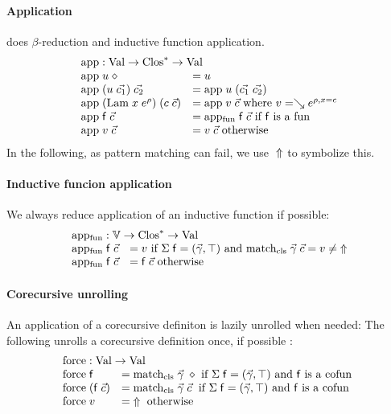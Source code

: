 \paragraph*{Application}
does $\beta$-reduction and inductive function application. 
\[
\begin{array}{ll}
\multicolumn{2}{l}{\ap : \Val \ra \ves{\Clos} \ra \Val}\\
\ap \; u \; \diamond & = u \\
\ap \; (u \; \vec{c_1}) \; \vec{c_2} & = \ap \; u \; (\vec{c_1}\;\vec{c_2})\\
\ap \; (\vlam \; x \; \cl{e}{\rho}) \; (c \; \vec{c}) & = \ap \; v \; \vec{c} \mbox{ where } v = \wh \cl{e}{\ins{\rho}{x}{c}} \\ 
\ap \; \ff \; \vec{c} & = \apf \; \ff \; \vec{c} \mbox{ if } \ff \mbox{ is a } \fun \\ 
\ap \; v \; \vec{c} & = v \; \vec{c} \mbox{ otherwise } \\
\end{array}
\]
In the following, as pattern matching can fail, we use $\;\Uparrow$ to symbolize this. 
\paragraph*{Inductive funcion application}
We always reduce application of an inductive function if possible:\[
\begin{array}{ll}
\multicolumn{2}{l}{\apf : \cV \ra \ves{\Clos} \ra \Val}\\
\apf \; \ff \; \vec{c} & = v \mbox{ if } \Sig \; \ff = (\vec{\gamma},\top) \mbox { and } \matchcls \; \vec{\gamma} \; \vec{c} = v \neq \stuck \\ 
\apf \; \ff \; \vec{c} & = \ff \; \vec{c} \mbox { otherwise } 
\end{array}
\]


\paragraph*{Corecursive unrolling}
An application of a corecursive definiton is lazily unrolled when needed: 
The following unrolls a corecursive definition once, if possible :
\[
\begin{array}{ll}
\multicolumn{2}{l}{\forc : \Val \ra \Val }\\
\forc \; \ff & = \matchcls \; \vec{\gamma} \; \diamond \mbox{ if } \Sig \; \ff = (\vec{\gamma},\top) \mbox{ and } \ff \mbox { is a } \cofun \\
\forc \; (\ff \; \vec{c}) & = \matchcls \; \vec{\gamma} \; \vec{c} \; \mbox{ if } \Sig \; \ff = (\vec{\gamma},\top) \mbox { and } \ff \mbox { is a } \cofun\\ 
\forc \; v & = \stuck \mbox{ otherwise}
\end{array}
\]



